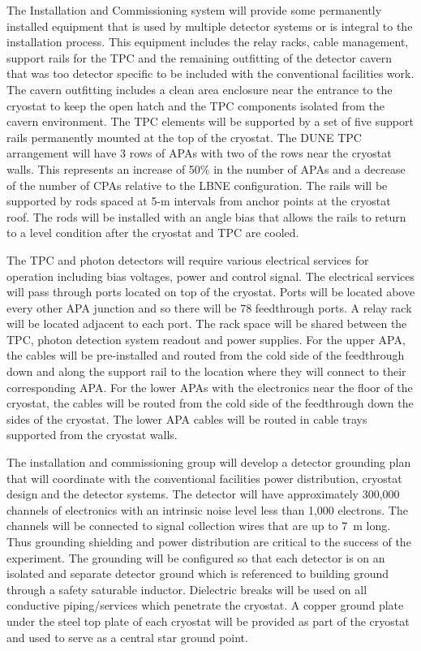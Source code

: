 The Installation and Commissioning system will provide some
permanently installed equipment that is used by multiple detector
systems or is integral to the installation process. This equipment
includes the relay racks, cable management, support rails for the TPC
and the remaining outfitting of the detector cavern that was too
detector specific to be included with the conventional facilities
work. The cavern outfitting includes a clean area enclosure near the
entrance to the cryostat to keep the open hatch and the TPC components
isolated from the cavern environment. The TPC elements will be
supported by a set of five support rails permanently mounted at the
top of the cryostat. The DUNE TPC arrangement will have 3 rows of APAs
with two of the rows near the cryostat walls. This represents an
increase of 50\% in the number of APAs and a decrease of the number of
CPAs relative to the LBNE configuration. The rails will be supported
by rods spaced at 5-m intervals from anchor points at the cryostat
roof. The rods will be installed with an angle bias that allows the
rails to return to a level condition after the cryostat and TPC are
cooled.

The TPC and photon detectors will require various electrical services
for operation including bias voltages, power and control signal. The
electrical services will pass through ports located on top of the
cryostat. Ports will be located above every other APA junction and so
there will be 78 feedthrough ports. A relay rack will be located
adjacent to each port. The rack space will be shared between the TPC,
photon detection system readout and power supplies. For the upper APA,
the cables will be pre-installed and routed from the cold side of the
feedthrough down and along the support rail to the location where they
will connect to their corresponding APA. For the lower APAs with the
electronics near the floor of the cryostat, the cables will be routed
from the cold side of the feedthrough down the sides of the
cryostat. The lower APA cables will be routed in cable trays supported
from the cryostat walls.

The installation and commissioning group will develop a detector
grounding plan that will coordinate with the conventional facilities
power distribution, cryostat design and the detector systems.  The
detector will have approximately 300,000 channels of electronics with
an intrinsic noise level less than 1,000 electrons. The channels will
be connected to signal collection wires that are up to 7~m long. Thus
grounding shielding and power distribution are critical to the success
of the experiment. The grounding will be configured so that each
detector is on an isolated and separate detector ground which is
referenced to building ground through a safety saturable inductor.
Dielectric breaks will be used on all conductive piping/services which
penetrate the cryostat.  A copper ground plate under the steel top
plate of each cryostat will be provided as part of the cryostat and
used to serve as a central star ground point.

